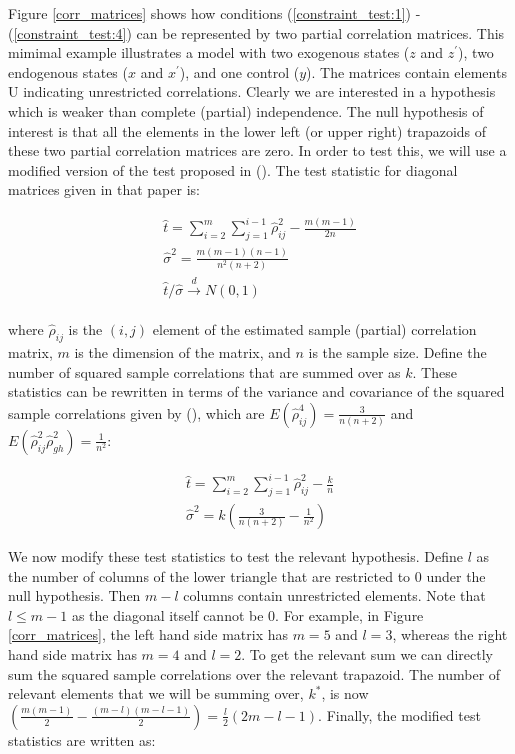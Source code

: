 \documentclass{article}
\begin{document}
Figure \ref{corr_matrices} shows how conditions (\ref{constraint_test:1}) - (\ref{constraint_test:4}) can be represented by two partial correlation matrices. This mimimal example illustrates a model with two exogenous states ($z$ and $z^{\prime}$), two endogenous states ($x$ and $x^\prime$), and one control ($y$). The matrices contain elements U indicating unrestricted correlations. Clearly we are interested in a hypothesis which is weaker than complete (partial) independence. The null hypothesis of interest is that all the elements in the lower left (or upper right) trapazoids of these two partial correlation matrices are zero. In order to test this, we will use a modified version of the test proposed in \citeauthor{schott2005testing} (\citeyear{schott2005testing}). The test statistic for diagonal matrices given in that paper is:

\begin{align}
  \hat{t} = \sum_{i=2}^m \sum_{j=1}^{i-1} \hat{\rho}^2_{ij} - \frac{m(m-1)}{2n} \\
  \hat{\sigma}^2 = \frac{m(m-1)(n-1)}{n^2(n+2)} \\
  \hat{t} / \hat{\sigma} \xrightarrow[]{d} N(0,1)
\end{align}

where $\hat{\rho}_{ij}$ is the $(i,j)$ element of the estimated sample (partial) correlation matrix, $m$ is the dimension of the matrix, and $n$ is the sample size. Define the number of squared sample correlations that are summed over as $k$. These statistics can be rewritten in terms of the variance and covariance of the squared sample correlations given by \citeauthor{schott2005testing} (\citeyear{schott2005testing}), which are $E(\hat{\rho}_{ij}^4) = \frac{3}{n(n+2)}$ and $E(\hat{\rho}_{ij}^2\hat{\rho}_{gh}^2) = \frac{1}{n^2}$:

\begin{align}
  \hat{t} = \sum_{i=2}^m \sum_{j=1}^{i-1} \hat{\rho}^2_{ij} - \frac{k}{n} \\
  \hat{\sigma}^2 = k(\frac{3}{n(n+2)} - \frac{1}{n^2})
\end{align}

We now modify these test statistics to test the relevant hypothesis. Define $l$ as the number of columns of the lower triangle that are restricted to 0 under the null hypothesis. Then $m - l$ columns contain unrestricted elements. Note that $l \leq m - 1$ as the diagonal itself cannot be 0. For example, in Figure \ref{corr_matrices}, the left hand side matrix has $m=5$ and $l=3$, whereas the right hand side matrix has $m=4$ and $l=2$. To get the relevant sum we can directly sum the squared sample correlations over the relevant trapazoid. The number of relevant elements that we will be summing over, $k^*$, is now $(\frac{m(m-1)}{2}-\frac{(m-l)(m-l-1)}{2}) = \frac{l}{2}(2m-l-1)$. Finally, the modified test statistics are written as:
\end{document}
